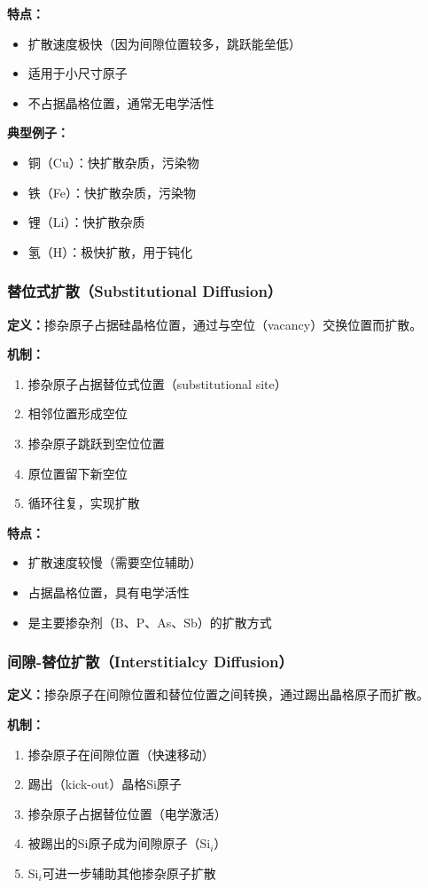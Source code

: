 \documentclass[UTF8,12pt,a4paper]{ctexart}
\begin{document}
\textbf{特点：}
\begin{itemize}
    \item 扩散速度极快（因为间隙位置较多，跳跃能垒低）
    \item 适用于小尺寸原子
    \item 不占据晶格位置，通常无电学活性
\end{itemize}

\textbf{典型例子：}
\begin{itemize}
    \item 铜（Cu）：快扩散杂质，污染物
    \item 铁（Fe）：快扩散杂质，污染物
    \item 锂（Li）：快扩散杂质
    \item 氢（H）：极快扩散，用于钝化
\end{itemize}

\subsubsection{替位式扩散（Substitutional Diffusion）}

\textbf{定义：}掺杂原子占据硅晶格位置，通过与空位（vacancy）交换位置而扩散。

\textbf{机制：}
\begin{enumerate}
    \item 掺杂原子占据替位式位置（substitutional site）
    \item 相邻位置形成空位
    \item 掺杂原子跳跃到空位位置
    \item 原位置留下新空位
    \item 循环往复，实现扩散
\end{enumerate}

\textbf{特点：}
\begin{itemize}
    \item 扩散速度较慢（需要空位辅助）
    \item 占据晶格位置，具有电学活性
    \item 是主要掺杂剂（B、P、As、Sb）的扩散方式
\end{itemize}

\subsubsection{间隙-替位扩散（Interstitialcy Diffusion）}

\textbf{定义：}掺杂原子在间隙位置和替位位置之间转换，通过踢出晶格原子而扩散。

\textbf{机制：}
\begin{enumerate}
    \item 掺杂原子在间隙位置（快速移动）
    \item 踢出（kick-out）晶格Si原子
    \item 掺杂原子占据替位位置（电学激活）
    \item 被踢出的Si原子成为间隙原子（Si$_i$）
    \item Si$_i$可进一步辅助其他掺杂原子扩散
\end{enumerate}
\end{document}
